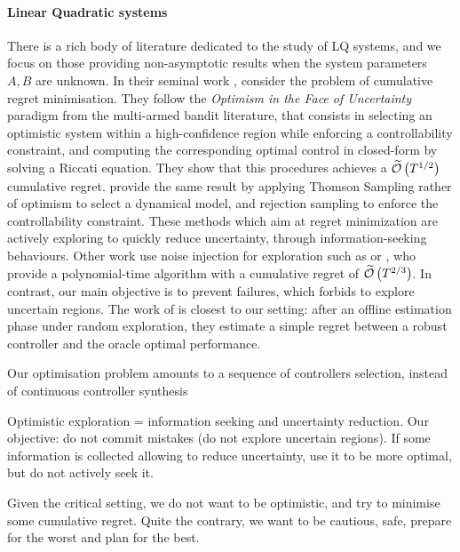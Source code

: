 \documentclass{article}
\begin{document}
\paragraph{Linear Quadratic systems} There is a rich body of literature dedicated to the study of LQ systems, and we focus on those providing non-asymptotic results when the system parameters $A, B$ are unknown. In their seminal work \citet{abbasi-yadkori11a}, consider the problem of cumulative regret minimisation. They follow the \emph{Optimism in the Face of Uncertainty} paradigm from the multi-armed bandit literature, that consists in selecting an optimistic system within a high-confidence region while enforcing a controllability constraint, and computing the corresponding optimal control in closed-form by solving a Riccati equation. They show that this procedures achieves a $\widetilde{\mathcal{O}}\left(T^{1/2}\right)$ cumulative regret. \citet{abeille18a} provide the same result by applying Thomson Sampling rather of optimism to select a dynamical model, and rejection sampling to enforce the controllability constraint. These methods which aim at regret minimization are actively exploring to quickly reduce uncertainty, through information-seeking behaviours. Other work use noise injection for exploration such as \citep{Dean2017} or \citep{Dean2018}, who provide a polynomial-time algorithm with a cumulative regret of $\widetilde{\mathcal{O}}\left(T^{2/3}\right)$. In contrast, our main objective is to prevent failures, which forbids to explore uncertain regions.
The work of \citet{Dean2017} is closest to our setting: after an offline estimation phase under random exploration, they estimate a simple regret between a robust controller and the oracle optimal performance.
    
Our optimisation problem amounts to a sequence of controllers selection, instead of continuous controller synthesis
    
Optimistic exploration = information seeking and uncertainty reduction. Our objective: do not commit mistakes (do not explore uncertain regions). If some information is collected allowing to reduce uncertainty, use it to be more optimal, but do not actively seek it.

Given the critical setting, we do not want to be optimistic, and try to minimise some cumulative regret. Quite the contrary, we want to be cautious, safe, prepare for the worst and plan for the best. 
\end{document}
